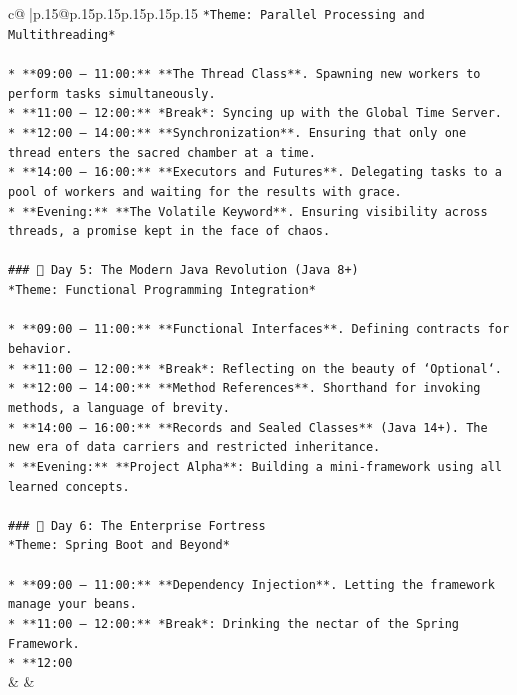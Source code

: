 \documentclass{article}
\begin{document}
{\begin{supertabular}{c@{$\;$}|p{.15\linewidth}@{}p{.15\linewidth}p{.15\linewidth}p{.15\linewidth}p{.15\linewidth}p{.15\linewidth}}
{{{\texttt{*Theme: Parallel Processing and Multithreading*} \\
\\ 
\texttt{*   **09:00 – 11:00:** **The Thread Class**. Spawning new workers to perform tasks simultaneously.} \\
\texttt{*   **11:00 – 12:00:** *Break*: Syncing up with the Global Time Server.} \\
\texttt{*   **12:00 – 14:00:** **Synchronization**. Ensuring that only one thread enters the sacred chamber at a time.} \\
\texttt{*   **14:00 – 16:00:** **Executors and Futures**. Delegating tasks to a pool of workers and waiting for the results with grace.} \\
\texttt{*   **Evening:** **The Volatile Keyword**. Ensuring visibility across threads, a promise kept in the face of chaos.} \\
\\ 
\texttt{\#\#\# 📅 Day 5: The Modern Java Revolution (Java 8+)} \\
\texttt{*Theme: Functional Programming Integration*} \\
\\ 
\texttt{*   **09:00 – 11:00:** **Functional Interfaces**. Defining contracts for behavior.} \\
\texttt{*   **11:00 – 12:00:** *Break*: Reflecting on the beauty of `Optional`.} \\
\texttt{*   **12:00 – 14:00:** **Method References**. Shorthand for invoking methods, a language of brevity.} \\
\texttt{*   **14:00 – 16:00:** **Records and Sealed Classes** (Java 14+). The new era of data carriers and restricted inheritance.} \\
\texttt{*   **Evening:** **Project Alpha**: Building a mini{-}framework using all learned concepts.} \\
\\ 
\texttt{\#\#\# 📅 Day 6: The Enterprise Fortress} \\
\texttt{*Theme: Spring Boot and Beyond*} \\
\\ 
\texttt{*   **09:00 – 11:00:** **Dependency Injection**. Letting the framework manage your beans.} \\
\texttt{*   **11:00 – 12:00:** *Break*: Drinking the nectar of the Spring Framework.} \\
\texttt{*   **12:00} \\
            }
        }
    }
    & & \\ \\


\end{supertabular}}
\end{document}
